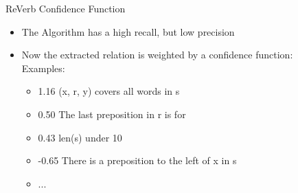 \documentclass[11pt]{beamer}
\begin{document}
		\begin{frame}{ReVerb Confidence Function}
					\begin{center}
						\begin{itemize}
						\item The Algorithm has a high recall, but low precision
						\item Now the extracted relation is weighted by a confidence function:\\
						Examples:
						\begin{itemize}	
						\item 1.16 (x, r, y) covers all words in s
						\item 0.50 The last preposition in r is for
						\item 0.43 len(s) under 10
						\item -0.65 There is a preposition to the left of x in s 
						\item ...
						\end{itemize}
						\end{itemize}
						
					\end{center}
				\end{frame}
				
\end{document}
